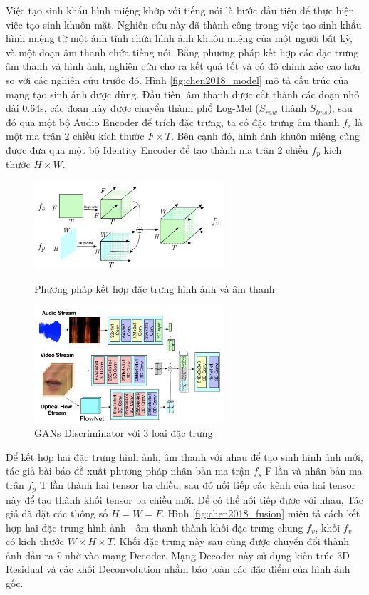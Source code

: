 Việc tạo sinh khẩu hình miệng khớp với tiếng nói là bước đầu tiên để thực hiện việc tạo sinh khuôn mặt. Nghiên cứu này đã thành công trong việc tạo sinh khẩu hình miệng từ một ảnh tĩnh chứa hình ảnh khuôn miệng của một người bất kỳ, và một đoạn âm thanh chứa tiếng nói. Bằng phương pháp kết hợp các đặc trưng âm thanh và hình ảnh, nghiên cứu cho ra kết quả tốt và có độ chính xác cao hơn so với các nghiên cứu trước đó. Hình \ref{fig:chen2018_model} mô tả cấu trúc của mạng tạo sinh ảnh được dùng. Đầu tiên, âm thanh được cắt thành các đoạn nhỏ dài 0.64s, các đoạn này được chuyển thành phổ Log-Mel ($S_{raw}$ thành $S_{lms}$), sau đó qua một bộ Audio Encoder để trích đặc trưng, ta có đặc trưng âm thanh $f_s$ là một ma trận 2 chiều kích thước $F \times T$. Bên cạnh đó, hình ảnh khuôn miệng cũng được đưa qua một bộ Identity Encoder để tạo thành ma trận 2 chiều $f_p$ kich thước $H \times W$.

\begin{figure}[H]
    \centering
    \begin{minipage}{0.48\textwidth}
        \includegraphics[width=7cm]{./content/images/chen2018_fusion.png}
        \caption{Phương pháp kết hợp đặc trưng hình ảnh và âm thanh}
        \label{fig:chen2018_fusion}
    \end{minipage}\hfill
    \begin{minipage}{0.48\textwidth}
        \includegraphics[width=7cm]{./content/images/chen2018_gans.png}
        \caption{GANs Discriminator với 3 loại đặc trưng}
        \label{fig:chen2018_gans}
    \end{minipage}
\end{figure}

Để kết hợp hai đặc trưng hình ảnh, âm thanh với nhau để tạo sinh hình ảnh mới, tác giả bài báo đề xuất phương pháp nhân bản ma trận $f_s$ F lần và nhân bản ma trận $f_p$ T lần thành hai tensor ba chiều, sau đó nối tiếp các kênh của hai tensor này để tạo thành khối tensor ba chiều mới. Để có thể nối tiếp được với nhau, Tác giả đã đặt các thông số $H = W = F$. Hình \ref{fig:chen2018_fusion} miêu tả cách kết hợp hai đặc trưng hình ảnh - âm thanh thành khối đặc trưng chung $f_v$, khối $f_v$ có kích thước $W \times H \times T$. Khối đặc trưng này sau cùng được chuyển đổi thành ảnh đầu ra $\hat{v}$ nhờ vào mạng Decoder. Mạng Decoder này sử dụng kiến trúc 3D Residual và các khối Deconvolution nhằm bảo toàn các đặc điểm của hình ảnh gốc.

